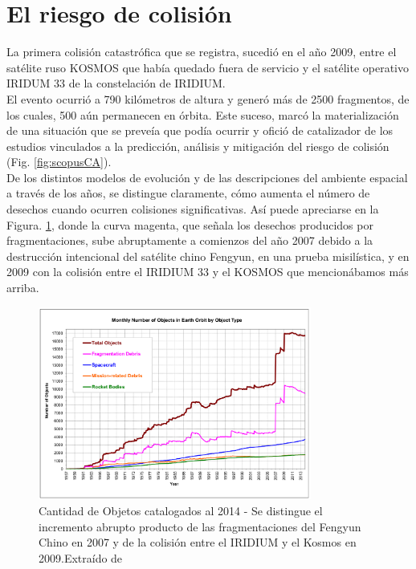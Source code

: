 \section{El riesgo de colisi\'on}

La primera colisi\'on catastr\'ofica que se registra, sucedi\'o en el a\~no 2009, entre el sat\'elite ruso KOSMOS  que hab\'ia quedado fuera de servicio y el sat\'elite operativo IRIDUM 33 de la constelaci\'on de IRIDIUM.\\

El evento ocurri\'o a 790 kil\'ometros de altura y gener\'o m\'as de 2500 fragmentos, de los cuales, 500 a\'un permanecen en \'orbita. Este suceso, marc\'o la materializaci\'on de una situaci\'on que se preve\'ia que pod\'ia ocurrir y ofici\'o de catalizador de los estudios vinculados a la predicci\'on, an\'alisis y mitigaci\'on del riesgo de colisi\'on (Fig. \ref{fig:scopusCA}).\\

De los distintos modelos de evoluci\'on y de las descripciones del ambiente espacial a trav\'es de los a\~nos, se distingue claramente, c\'omo aumenta el n\'umero de desechos cuando ocurren colisiones significativas. As\'i puede apreciarse en la Figura. \ref{fig:cantidad2014}, donde la curva magenta, que se\~nala los desechos producidos por fragmentaciones, sube abruptamente a comienzos del a\~no 2007 debido a la destrucci\'on intencional del sat\'elite chino Fengyun, en una prueba misil\'istica, y en 2009 con la colisi\'on entre el IRIDIUM 33 y el KOSMOS que mencion\'abamos m\'as arriba.\\

\begin{figure}[!h]
  \centering
  \includegraphics[width=0.8\textwidth]{imagenes/numero2014}
  \caption[Cantidad de Objetos catalogados al 2014]{Cantidad de Objetos catalogados al 2014 - Se distingue el incremento abrupto producto de las fragmentaciones del Fengyun Chino en 2007 y de la colisi\'on entre el IRIDIUM y el Kosmos en 2009.Extra\'ido de \citep{ODQN14}}
  \label{fig:cantidad2014}
\end{figure}

